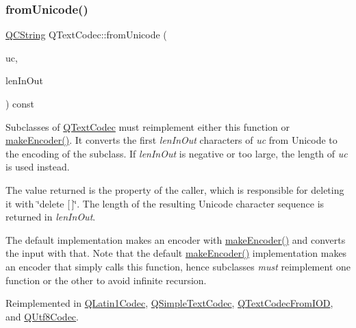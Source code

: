\subsubsection{\texorpdfstring{fromUnicode()}{fromUnicode()}\hspace{0.1cm}{\footnotesize\ttfamily [2/2]}}
{\footnotesize\ttfamily \mbox{\hyperlink{class_q_c_string}{Q\+C\+String}} Q\+Text\+Codec\+::from\+Unicode (\begin{DoxyParamCaption}\item[{const \mbox{\hyperlink{class_q_string}{Q\+String}} \&}]{uc,  }\item[{int \&}]{len\+In\+Out }\end{DoxyParamCaption}) const\hspace{0.3cm}{\ttfamily [virtual]}}

Subclasses of \mbox{\hyperlink{class_q_text_codec}{Q\+Text\+Codec}} must reimplement either this function or \mbox{\hyperlink{class_q_text_codec_aa7dccd7fc1b578de0b7599b040d98e11}{make\+Encoder()}}. It converts the first {\itshape len\+In\+Out} characters of {\itshape uc} from Unicode to the encoding of the subclass. If {\itshape len\+In\+Out} is negative or too large, the length of {\itshape uc} is used instead.

The value returned is the property of the caller, which is responsible for deleting it with \char`\"{}delete \mbox{[}$\,$\mbox{]}\char`\"{}. The length of the resulting Unicode character sequence is returned in {\itshape len\+In\+Out}.

The default implementation makes an encoder with \mbox{\hyperlink{class_q_text_codec_aa7dccd7fc1b578de0b7599b040d98e11}{make\+Encoder()}} and converts the input with that. Note that the default \mbox{\hyperlink{class_q_text_codec_aa7dccd7fc1b578de0b7599b040d98e11}{make\+Encoder()}} implementation makes an encoder that simply calls this function, hence subclasses {\itshape must} reimplement one function or the other to avoid infinite recursion. 

Reimplemented in \mbox{\hyperlink{class_q_latin1_codec_abb7f6a1587cc16a1641ce366dbdb3b52}{Q\+Latin1\+Codec}}, \mbox{\hyperlink{class_q_simple_text_codec_ac361f6788c0ef27376ed31744c0beaf4}{Q\+Simple\+Text\+Codec}}, \mbox{\hyperlink{class_q_text_codec_from_i_o_d_af5b4ad5ff7fbe98683b7bd7d54cd40c0}{Q\+Text\+Codec\+From\+I\+OD}}, and \mbox{\hyperlink{class_q_utf8_codec_a1fd5a6d941fd0e934a60118c118c96c7}{Q\+Utf8\+Codec}}.

\mbox{\label{class_q_text_codec_a4780a608d950994a927de727bb07b9fe}} 
